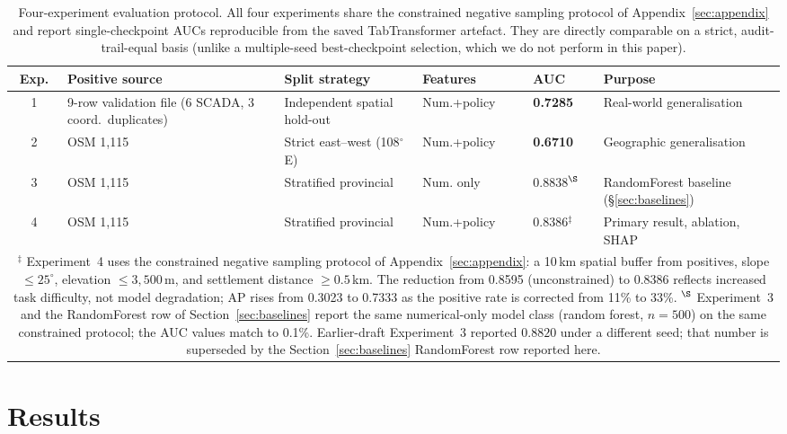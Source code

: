 \documentclass[12pt, a4paper]{article}
\begin{document}
\begin{table}[H]
\centering
\caption{Four-experiment evaluation protocol. All four
experiments share the constrained negative sampling
protocol of Appendix~\ref{sec:appendix} and report
single-checkpoint AUCs reproducible from the saved
TabTransformer artefact. They are directly comparable
on a strict, audit-trail-equal basis (unlike a
multiple-seed best-checkpoint selection, which we do
not perform in this paper).}
\label{tab:exps}
\small
\begin{tabularx}{\textwidth}{clXllX}
\toprule
\textbf{Exp.} & \textbf{Positive source} & \textbf{Split strategy} &
\textbf{Features} & \textbf{AUC} & \textbf{Purpose} \\
\midrule
1 & 9-row validation file (6 SCADA, 3 coord.\ duplicates) & Independent spatial hold-out &
  Num.+policy & \textbf{0.7285} & Real-world generalisation \\
2 & OSM 1,115 & Strict east--west (108$^\circ$E) &
  Num.+policy & \textbf{0.6710} & Geographic generalisation \\
3 & OSM 1,115 & Stratified provincial &
  Num. only & 0.8838$^\S$ & RandomForest baseline (§\ref{sec:baselines}) \\
4 & OSM 1,115 & Stratified provincial &
  Num.+policy & 0.8386$^\ddagger$ & Primary result, ablation, SHAP \\
\bottomrule
\multicolumn{6}{p{0.95\textwidth}}{\small
  $^\ddagger$ Experiment~4 uses the constrained negative
  sampling protocol of Appendix~\ref{sec:appendix}: a
  10\,km spatial buffer from positives, slope $\leq 25^\circ$,
  elevation $\leq 3{,}500$\,m, and settlement distance
  $\geq 0.5$\,km. The reduction from 0.8595 (unconstrained) to
  0.8386 reflects increased task difficulty, not model
  degradation; AP rises from 0.3023 to 0.7333 as the positive
  rate is corrected from 11\% to 33\%.
  $^\S$ Experiment~3 and the RandomForest row of
  Section~\ref{sec:baselines} report the same numerical-only
  model class (random forest, $n=500$) on the same
  constrained protocol; the AUC values match to 0.1\%.
  Earlier-draft Experiment~3 reported $0.8820$ under a
  different seed; that number is superseded by the
  Section~\ref{sec:baselines} RandomForest row reported
  here.} \\
\end{tabularx}
\end{table}

\section{Results}
\label{sec:results}
\end{document}
